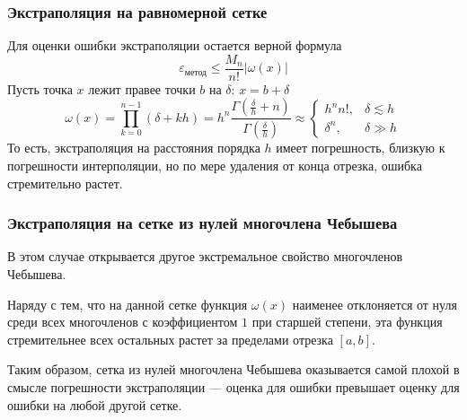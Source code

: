 \documentclass[aspectratio=43,unicode]{beamer}
\begin{document}
\begin{frame}
\frametitle{Экстраполяция на равномерной сетке}
	Для оценки ошибки экстраполяции остается верной формула
	\[
	\varepsilon_{\text{метод}} \leqslant \frac{M_n}{n!} |\omega(x)|
	\]
	Пусть точка $x$ лежит правее точки $b$ на $\delta$: $x = b + \delta$
	\[
	\omega(x) = \prod_{k=0}^{n-1} \left(\delta+kh\right) =
		h^n\frac{\Gamma\left(\frac{\delta}{h}+n\right)}{\Gamma\left(\frac{\delta}{h}\right)}
	\approx
	\begin{cases}
		h^n n!,& \delta \lesssim h\\
		\delta^n,& \delta \gg h
	\end{cases}
	\]
	То есть, экстраполяция на расстояния порядка $h$ имеет погрешность, близкую к погрешности интерполяции,
	но по мере удаления от конца отрезка, ошибка стремительно растет.
\end{frame}

\begin{frame}
\frametitle{Экстраполяция на сетке из нулей многочлена Чебышева}
	В этом случае открывается другое экстремальное свойство многочленов Чебышева.
	\pause

	Наряду с тем, что на данной сетке функция $\omega(x)$ наименее отклоняется от нуля
	среди всех многочленов с коэффициентом $1$ при старшей степени, эта функция
	стремительнее всех остальных растет за пределами отрезка $[a,b]$.
	\pause

	Таким образом, сетка из нулей многочлена Чебышева оказывается самой плохой
	в смысле погрешности экстраполяции --- оценка для ошибки превышает оценку
	для ошибки на любой другой сетке.
\end{frame}
\end{document}
